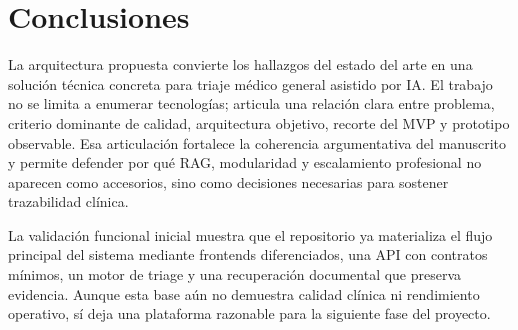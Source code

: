 \documentclass[12pt]{article}
\begin{document}
\section{Conclusiones}

La arquitectura propuesta convierte los hallazgos del estado del arte en una solución técnica concreta para triaje médico general asistido por IA. El trabajo no se limita a enumerar tecnologías; articula una relación clara entre problema, criterio dominante de calidad, arquitectura objetivo, recorte del MVP y prototipo observable. Esa articulación fortalece la coherencia argumentativa del manuscrito y permite defender por qué RAG, modularidad y escalamiento profesional no aparecen como accesorios, sino como decisiones necesarias para sostener trazabilidad clínica.

La validación funcional inicial muestra que el repositorio ya materializa el flujo principal del sistema mediante frontends diferenciados, una API con contratos mínimos, un motor de triage y una recuperación documental que preserva evidencia. Aunque esta base aún no demuestra calidad clínica ni rendimiento operativo, sí deja una plataforma razonable para la siguiente fase del proyecto.

\FloatBarrier


\end{document}
